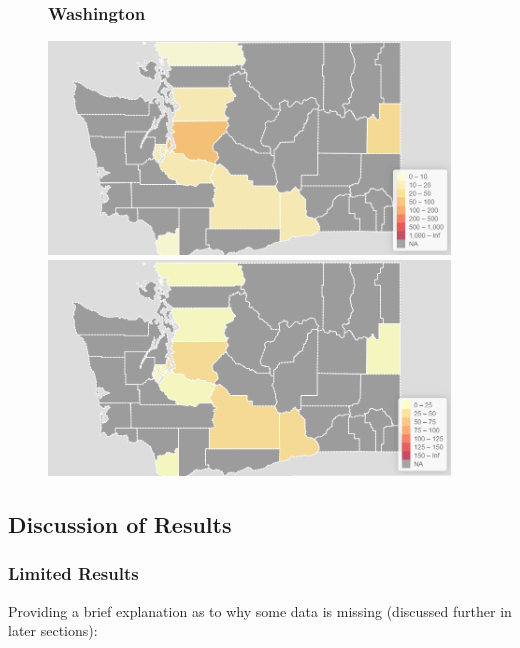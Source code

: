 \documentclass[11pt]{article}
\begin{document}
\newpage
\begin{figure}[H]
\subsubsection*{Washington}
\vspace{20pt}
\includegraphics[width=0.95\textwidth]{ImageResults/WashingtonTotal.PNG}
\vspace{40pt}
\includegraphics[width=0.95\textwidth]{ImageResults/Washington100k.PNG}
\end{figure}

\subsection{Discussion of Results}
\subsubsection{Limited Results}\label{s:limited results}
Providing a brief explanation as to why some data is missing (discussed further in later sections):
\end{document}

